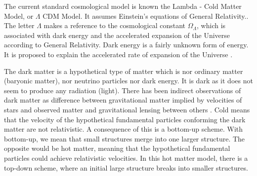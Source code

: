 \documentclass[12pt]{article}
\begin{document}
\begin{par}

The current standard cosmological model is known the Lambda
 - Cold Matter Model, or $\Lambda$ CDM Model. It assumes Einstein's equations of General Relativity.\cite{bertone_particle_2005}.\\
The
  letter $\Lambda$ makes a reference to the
   cosmological constant $\Omega_{\Lambda}$, which is
    associated with dark energy and the accelerated
     expansion of the Universe according to General
      Relativity. Dark energy is a fairly unknown form of
       energy. It is proposed to explain the accelerated
        rate of expansion of the Universe
         \cite{peebles_cosmological_2003}.
      
The dark matter is a hypothetical type of matter which is
 nor ordinary matter (baryonic matter), nor neutrino
  particles nor dark energy. It is dark as it does not
   seem to produce any radiation (light). There has been
    indirect observations of dark matter as difference
     between gravitational matter implied by velocities
      of stars and observed matter and gravitational
       lensing between others
        \cite{trimble_existence_1987}. Cold means that
         the velocity of the hypothetical fundamental
          particles conforming the dark matter are not
           relativistic. A consequence of this is a
            bottom-up scheme. With bottom-up, we mean
             that small structures merge into one larger
              structure. The opposite would be hot
               matter, meaning that the hypothetical
                fundamental particles could achieve
                 relativistic velocities. In this hot
                  matter model, there is a top-down
                   scheme,
    where an initial large structure breaks into smaller
     structures. \cite{bertone_particle_2005} \\
      
\end{par}
\end{document}
